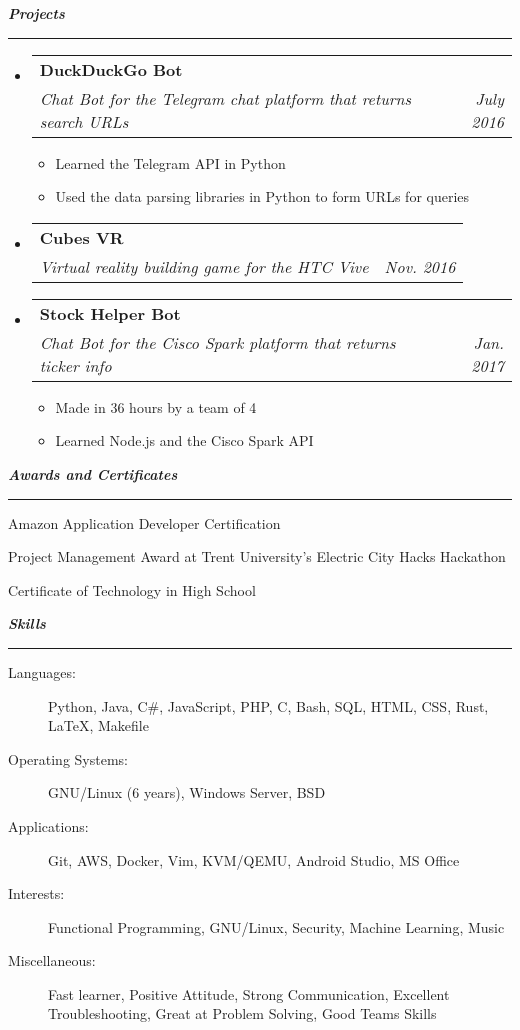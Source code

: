 \documentclass[letterpaper,11pt]{article}
\makeatletter
\newcommand{\resitem}[1]{\item #1 \vspace{-2pt}}
\newcommand{\mysection}[1]{\vspace{5pt} {\bfseries \textsl{#1}} \\ {\color{gray} \rule[5pt]{\textwidth}{1pt}}}
\newcommand{\ressubheading}[4]{\begin{tabular*}{6.5in}{l@{\extracolsep{\fill}}r}
        \textbf{#1} & #2 \\
        \textit{#3} & \textit{#4} \\
\end{tabular*}\vspace{-6pt}}
\makeatother
\begin{document}
\mysection{Projects}
\begin{itemize}
    \item
        \ressubheading{DuckDuckGo Bot}{}{Chat Bot for the Telegram chat platform that returns search URLs}{July 2016}
        \begin{itemize}
                \resitem{Learned the Telegram API in Python}
                \resitem{Used the data parsing libraries in Python to form URLs for queries}
        \end{itemize}

    \item
        \ressubheading{Cubes VR}{}{Virtual reality building game for the HTC Vive}{Nov. 2016}

    \item
        \ressubheading{Stock Helper Bot}{}{Chat Bot for the Cisco Spark platform that returns ticker info}{Jan. 2017}
        \begin{itemize}
                \resitem{Made in 36 hours by a team of 4}
                \resitem{Learned Node.js and the Cisco Spark API}
        \end{itemize}
\end{itemize}

\mysection{Awards and Certificates}
\begin{description}
    \item Amazon Application Developer Certification
    \item Project Management Award at Trent University's Electric City Hacks Hackathon
    \item Certificate of Technology in High School
\end{description}

\mysection{Skills}
\begin{description}
    \item[Languages:]
        Python, Java, C\#, JavaScript, PHP, C, Bash, SQL, HTML, CSS, Rust, \LaTeX{}, Makefile
    \item[Operating Systems:]
        GNU/Linux (6 years), Windows Server, BSD
    \item[Applications:]
        Git, AWS, Docker, Vim, KVM/QEMU, Android Studio, MS Office
    \item[Interests:]
        Functional Programming, GNU/Linux, Security, Machine Learning, Music
    \item[Miscellaneous:]
        Fast learner, Positive Attitude, Strong Communication, Excellent Troubleshooting, Great at Problem Solving, Good Teams Skills
\end{description}
\end{document}

